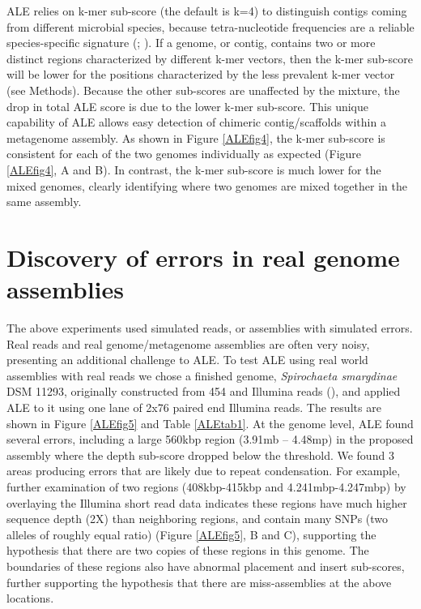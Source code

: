 \documentclass[phd,tocprelim]{cornell}
\begin{document}
ALE relies on k-mer sub-score (the default is k=4) to distinguish contigs coming from different microbial species, because tetra-nucleotide frequencies are a reliable species-specific signature (\cite{Teeling2004}; \cite{Woyke2006}). If a genome, or contig, contains two or more distinct regions characterized by different k-mer vectors, then the k-mer sub-score will be lower for the positions characterized by the less prevalent k-mer vector (see Methods). Because the other sub-scores are unaffected by the mixture, the drop in total ALE score is due to the lower k-mer sub-score. This unique capability of ALE allows easy detection of chimeric contig/scaffolds within a metagenome assembly. As shown in Figure \ref{ALEfig4}, the k-mer sub-score is consistent for each of the two genomes individually as expected (Figure \ref{ALEfig4}, A and B). In contrast, the k-mer sub-score is much lower for the mixed genomes, clearly identifying where two genomes are mixed together in the same assembly.

\section{Discovery of errors in real genome assemblies}
\label{ALE_res_spiro}

The above experiments used simulated reads, or assemblies with simulated errors. Real reads and real genome/metagenome assemblies are often very noisy, presenting an additional challenge to ALE. To test ALE using real world assemblies with real reads we chose a finished genome, {\it Spirochaeta smargdinae} DSM 11293, originally constructed from 454 and Illumina reads (\cite{Mavromatis2010}), and applied ALE to it using one lane of 2x76 paired end Illumina reads. The results are shown in Figure \ref{ALEfig5} and Table \ref{ALEtab1}. At the genome level, ALE found several errors, including a large 560kbp region (3.91mb – 4.48mp) in the proposed assembly where the depth sub-score dropped below the threshold. We found 3 areas producing errors that are likely due to repeat condensation. For example, further examination of two regions (408kbp-415kbp and 4.241mbp-4.247mbp) by overlaying the Illumina short read data indicates these regions have much higher sequence depth (2X) than neighboring regions, and contain many SNPs (two alleles of roughly equal ratio) (Figure \ref{ALEfig5}, B and C), supporting the hypothesis that there are two copies of these regions in this genome. The boundaries of these regions also have abnormal placement and insert sub-scores, further supporting the hypothesis that there are miss-assemblies at the above locations.
\end{document}
